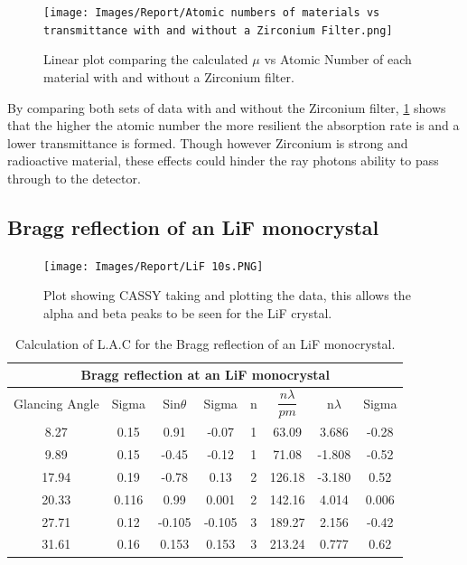 \documentclass[12pt]{article}
\begin{document}
\begin{figure}[H]
\centering
\texttt{[image: Images/Report/Atomic numbers of materials vs transmittance with and without a Zirconium Filter.png]}
\caption{Linear plot comparing the calculated $\mu$ vs Atomic Number of each material with and without a Zirconium filter.}
\label{Absrober 2}
\end{figure}

By comparing both sets of data with and without the Zirconium filter, \cref{Absrober 2} shows that the higher the atomic number the more resilient the absorption rate is and a lower transmittance is formed. Though however Zirconium is strong and radioactive material, these effects could hinder the ray photons ability to pass through to the detector.

\subsection{Bragg reflection of an LiF monocrystal}
\label{Bragg reflection of an LiF monocrystal SubSection}

\begin{figure}[H]
\centering
\texttt{[image: Images/Report/LiF 10s.PNG]}
\caption{Plot showing CASSY taking and plotting the data, this allows the alpha and beta peaks to be seen for the LiF crystal.}
\label{LiF graph}
\end{figure}

\begin{table}[H]
\begin{center}
 \footnotesize
 \begin{tabular}{|c|c||c|c||c||c|c|c|}
 \hline
 \multicolumn{8}{|c|}{Bragg reflection at an LiF monocrystal} \\
 \hline 
 Glancing Angle & Sigma & Sin$\theta$ & Sigma & n & $\dfrac{n\lambda}{pm}$ & n$\lambda$ & Sigma\\
 \hline \hline
  8.27 & 0.15 & 0.91 & -0.07 & 1 & 63.09 & 3.686 & -0.28 \\
  \hline
  9.89 & 0.15 & -0.45 & -0.12 & 1 & 71.08 & -1.808 & -0.52 \\
 \hline 
  17.94 & 0.19 & -0.78 & 0.13 & 2 & 126.18 & -3.180 & 0.52  \\
 \hline
  20.33 & 0.116 & 0.99 & 0.001 & 2 & 142.16 & 4.014 & 0.006\\
 \hline 
  27.71 & 0.12 & -0.105 & -0.105 & 3 & 189.27 & 2.156 & -0.42\\
 \hline
  31.61 & 0.16 & 0.153 & 0.153 & 3 & 213.24 & 0.777 & 0.62 \\
 \hline
 \end{tabular} \\ 
 \caption{Calculation of L.A.C for the Bragg reflection of an LiF monocrystal.}
 \label{Bragg LiF Reflection}
\end{center}
\end{table}
\end{document}
